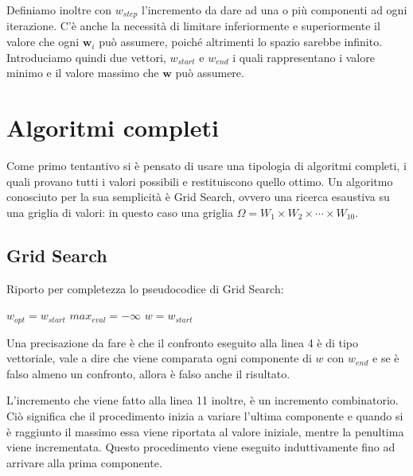 Definiamo inoltre con $w_{step}$ l'incremento da dare ad una o più
componenti ad ogni iterazione.
C'è anche la necessità di limitare inferiormente e superiormente
il valore che ogni $\boldsymbol{w}_i$ può assumere,
poiché altrimenti lo spazio sarebbe infinito. 
Introduciamo quindi
due vettori, $w_{start}$ e $w_{end}$ i quali rappresentano
i valore minimo e il valore massimo che $\boldsymbol{w}$
può assumere.

\section{Algoritmi completi}
Come primo tentantivo si è pensato di usare una tipologia di algoritmi completi,
i quali provano tutti i valori possibili e restituiscono quello ottimo. Un algoritmo
conosciuto per la sua semplicità è Grid Search, ovvero una ricerca esaustiva
su una griglia di valori: in questo caso una griglia $\Omega = W_1 \times W_2 \times \cdots \times W_{10}$.

\subsection{Grid Search}

Riporto per completezza lo pseudocodice di Grid Search:

\begin{algorithm}[h]
	\small
	\DontPrintSemicolon
	\BlankLine
	$w_{opt} = w_{start}$\;
	$max_{eval} = -\infty$\;
	$w = w_{start}$\;
	\BlankLine
	\caption{\textsc{}}
	\label{alg:gss}
\end{algorithm}

Una precisazione da fare è che il confronto
eseguito alla linea 4 è di tipo vettoriale, vale a dire che
viene comparata ogni componente di $w$ con $w_{end}$ e se
è falso almeno un confronto, allora è falso anche il risultato.

L'incremento che viene fatto alla linea 11 inoltre, è un incremento
combinatorio. Ciò significa che il procedimento inizia a variare
l'ultima componente e quando si è raggiunto il massimo essa
viene riportata al valore iniziale, mentre la penultima viene incrementata.
Questo procedimento viene eseguito induttivamente fino ad arrivare alla prima
componente.

